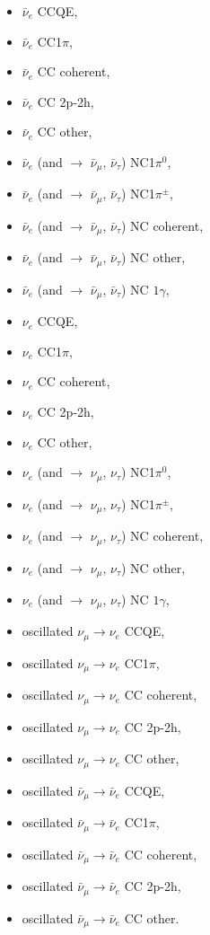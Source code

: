 \begin{itemize}
\item  $\bar{\nu}_{e}$ CCQE,
\item  $\bar{\nu}_{e}$ CC1$\pi$,
\item  $\bar{\nu}_{e}$ CC coherent,
\item  $\bar{\nu}_{e}$ CC 2p-2h,
\item  $\bar{\nu}_{e}$ CC other,
\item  $\bar{\nu}_{e}$ (and $\rightarrow$ $\bar{\nu}_{\mu}$, $\bar{\nu}_{\tau}$) NC1$\pi^{0}$,
\item  $\bar{\nu}_{e}$ (and $\rightarrow$ $\bar{\nu}_{\mu}$, $\bar{\nu}_{\tau}$) NC1$\pi^{\pm}$,
\item  $\bar{\nu}_{e}$ (and $\rightarrow$ $\bar{\nu}_{\mu}$, $\bar{\nu}_{\tau}$) NC coherent,
\item  $\bar{\nu}_{e}$ (and $\rightarrow$ $\bar{\nu}_{\mu}$, $\bar{\nu}_{\tau}$) NC other,
\item  $\bar{\nu}_{e}$ (and $\rightarrow$ $\bar{\nu}_{\mu}$, $\bar{\nu}_{\tau}$) NC $1\gamma$,

\item  $\nu_{e}$ CCQE, 
\item  $\nu_{e}$ CC1$\pi$,
\item  $\nu_{e}$ CC coherent,
\item  $\nu_{e}$ CC 2p-2h,
\item  $\nu_{e}$ CC other,
\item  $\nu_{e}$ (and $\rightarrow$ $\nu_{\mu}$, $\nu_{\tau}$) NC1$\pi^{0}$,
\item  $\nu_{e}$ (and $\rightarrow$ $\nu_{\mu}$, $\nu_{\tau}$) NC1$\pi^{\pm}$,
\item  $\nu_{e}$ (and $\rightarrow$ $\nu_{\mu}$, $\nu_{\tau}$) NC coherent,
\item  $\nu_{e}$ (and $\rightarrow$ $\nu_{\mu}$, $\nu_{\tau}$) NC other,
\item  $\nu_{e}$ (and $\rightarrow$ $\nu_{\mu}$, $\nu_{\tau}$) NC $1\gamma$,

\item  oscillated $\nu_{\mu} \rightarrow \nu_{e}$ CCQE,
\item  oscillated $\nu_{\mu} \rightarrow \nu_{e}$ CC1$\pi$,
\item  oscillated $\nu_{\mu} \rightarrow \nu_{e}$ CC coherent,
\item  oscillated $\nu_{\mu} \rightarrow \nu_{e}$ CC 2p-2h,
\item  oscillated $\nu_{\mu} \rightarrow \nu_{e}$ CC other,

\item  oscillated $\bar{\nu}_{\mu} \rightarrow \bar{\nu}_{e}$ CCQE,
\item  oscillated $\bar{\nu}_{\mu} \rightarrow \bar{\nu}_{e}$ CC1$\pi$,
\item  oscillated $\bar{\nu}_{\mu} \rightarrow \bar{\nu}_{e}$ CC coherent,
\item  oscillated $\bar{\nu}_{\mu} \rightarrow \bar{\nu}_{e}$ CC 2p-2h,
\item  oscillated $\bar{\nu}_{\mu} \rightarrow \bar{\nu}_{e}$ CC other.


\end{itemize}
